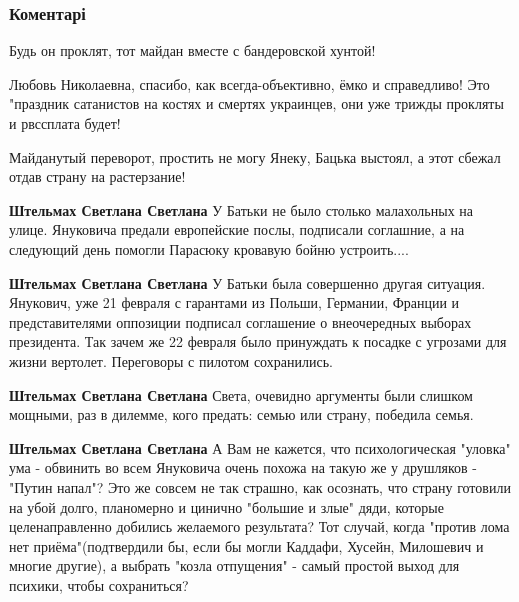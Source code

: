  
 
 
 
 
\subsubsection{Коментарі}
\label{sec:21_11_2021.fb.chub_ljubov.ukraina.1.maidan_8_let.cmt}

\begin{itemize} %
Будь он проклят, тот майдан вместе с бандеровской хунтой!


Любовь Николаевна, спасибо, как всегда-объективно, ёмко и справедливо! Это
"праздник сатанистов на костях и смертях украинцев, они уже трижды прокляты и
рвссплата будет!

Майданутый переворот, простить не могу Янеку, Бацька выстоял, а этот сбежал отдав страну на растерзание!

\begin{itemize} %
\textbf{Штельмах Светлана Светлана} У Батьки не было столько малахольных на улице. Януковича предали европейские послы, подписали соглашние, а на следующий день помогли Парасюку кровавую бойню устроить....

\textbf{Штельмах Светлана Светлана} У Батьки была совершенно другая ситуация. Янукович, уже 21 февраля с гарантами из Польши, Германии, Франции и представителями оппозиции подписал соглашение о внеочередных выборах президента. Так зачем же 22 февраля было принуждать к посадке с угрозами для жизни вертолет. Переговоры с пилотом сохранились.


\textbf{Штельмах Светлана Светлана} Света, очевидно аргументы были слишком мощными, раз в дилемме, кого предать: семью или страну, победила семья.

\textbf{Штельмах Светлана Светлана} А Вам не кажется, что психологическая "уловка" ума - обвинить во всем Януковича очень похожа на такую же у друшляков - "Путин напал"? Это же совсем не так страшно, как осознать, что страну готовили на убой долго, планомерно и цинично "большие и злые" дяди, которые целенаправленно добились желаемого результата? Тот случай, когда "против лома нет приёма"(подтвердили бы, если бы могли Каддафи, Хусейн, Милошевич и многие другие), а выбрать "козла отпущения" - самый простой выход для психики, чтобы сохраниться?


\end{itemize}
\end{itemize}
